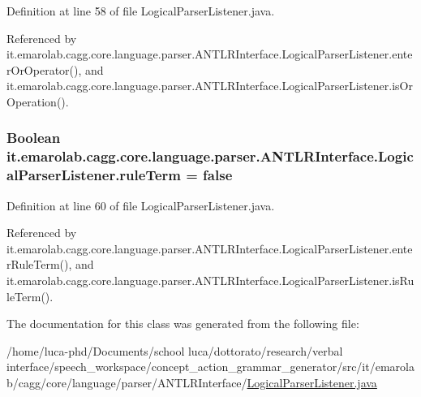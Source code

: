 Definition at line 58 of file Logical\-Parser\-Listener.\-java.



Referenced by it.\-emarolab.\-cagg.\-core.\-language.\-parser.\-A\-N\-T\-L\-R\-Interface.\-Logical\-Parser\-Listener.\-enter\-Or\-Operator(), and it.\-emarolab.\-cagg.\-core.\-language.\-parser.\-A\-N\-T\-L\-R\-Interface.\-Logical\-Parser\-Listener.\-is\-Or\-Operation().

\hypertarget{classit_1_1emarolab_1_1cagg_1_1core_1_1language_1_1parser_1_1ANTLRInterface_1_1LogicalParserListener_abb6511e6611e1f0eb8a993c2f26eb429}{
\subsubsection[{rule\-Term}]{\setlength{\rightskip}{0pt plus 5cm}Boolean it.\-emarolab.\-cagg.\-core.\-language.\-parser.\-A\-N\-T\-L\-R\-Interface.\-Logical\-Parser\-Listener.\-rule\-Term = false\hspace{0.3cm}{\ttfamily [private]}}}\label{classit_1_1emarolab_1_1cagg_1_1core_1_1language_1_1parser_1_1ANTLRInterface_1_1LogicalParserListener_abb6511e6611e1f0eb8a993c2f26eb429}


Definition at line 60 of file Logical\-Parser\-Listener.\-java.



Referenced by it.\-emarolab.\-cagg.\-core.\-language.\-parser.\-A\-N\-T\-L\-R\-Interface.\-Logical\-Parser\-Listener.\-enter\-Rule\-Term(), and it.\-emarolab.\-cagg.\-core.\-language.\-parser.\-A\-N\-T\-L\-R\-Interface.\-Logical\-Parser\-Listener.\-is\-Rule\-Term().



The documentation for this class was generated from the following file\-:\begin{DoxyCompactItemize}
\item 
/home/luca-\/phd/\-Documents/school luca/dottorato/research/verbal interface/speech\-\_\-workspace/concept\-\_\-action\-\_\-grammar\-\_\-generator/src/it/emarolab/cagg/core/language/parser/\-A\-N\-T\-L\-R\-Interface/\hyperlink{LogicalParserListener_8java}{Logical\-Parser\-Listener.\-java}\end{DoxyCompactItemize}
